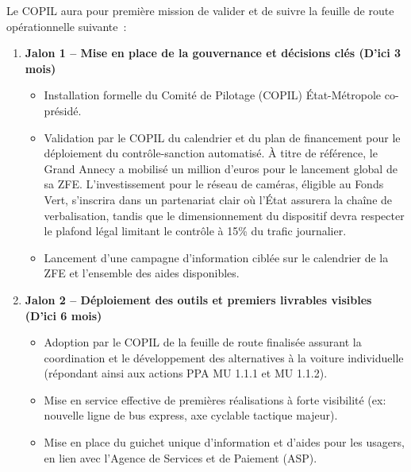 \documentclass[12pt,a4paper]{article}
\begin{document}
\noindent Le COPIL aura pour première mission de valider et de suivre la feuille de route opérationnelle suivante~:

\begin{enumerate}
    \item \textbf{Jalon 1 – Mise en place de la gouvernance et décisions clés (D'ici 3 mois)}
    \begin{itemize}[label=\textbullet, leftmargin=*]
        \item Installation formelle du Comité de Pilotage (COPIL) État-Métropole co-présidé.
        \item Validation par le COPIL du calendrier et du plan de financement pour le déploiement du contrôle-sanction automatisé. À titre de référence, le Grand Annecy a mobilisé un million d'euros pour le lancement global de sa ZFE. L'investissement pour le réseau de caméras, éligible au Fonds Vert, s'inscrira dans un partenariat clair où l'État assurera la chaîne de verbalisation, tandis que le dimensionnement du dispositif devra respecter le plafond légal limitant le contrôle à 15\% du trafic journalier.
        \item Lancement d'une campagne d'information ciblée sur le calendrier de la ZFE et l'ensemble des aides disponibles.
    \end{itemize}

    \item \textbf{Jalon 2 – Déploiement des outils et premiers livrables visibles (D'ici 6 mois)}
    \begin{itemize}[label=\textbullet, leftmargin=*]
        \item Adoption par le COPIL de la feuille de route finalisée assurant la coordination et le développement des alternatives à la voiture individuelle (répondant ainsi aux actions PPA MU 1.1.1 et MU 1.1.2).
        \item Mise en service effective de premières réalisations à forte visibilité (ex: nouvelle ligne de bus express, axe cyclable tactique majeur).
        \item Mise en place du guichet unique d'information et d'aides pour les usagers, en lien avec l'Agence de Services et de Paiement (ASP).
    \end{itemize}


\end{enumerate}
\end{document}
